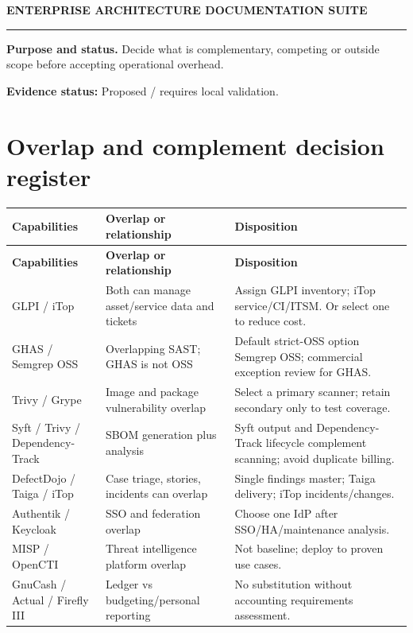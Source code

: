 \documentclass[10pt,letterpaper]{article}
\begin{document}
\begin{center}
{\large\bfseries\color{teal} ENTERPRISE ARCHITECTURE DOCUMENTATION SUITE}\par
{}\par
{}\par
\end{center}
\vspace{8pt}\hrule\vspace{12pt}
\textbf{Purpose and status.} Decide what is complementary, competing or outside scope before accepting operational overhead.\par
\textbf{Evidence status:} Proposed / requires local validation.\par
\section{Overlap and complement decision register}
\small\begin{longtable}{>{\raggedright\arraybackslash}p{}>{\raggedright\arraybackslash}p{}>{\raggedright\arraybackslash}p{}}
\toprule
\textbf{Capabilities} & \textbf{Overlap or relationship} & \textbf{Disposition}\\
\midrule\endfirsthead
\toprule
\textbf{Capabilities} & \textbf{Overlap or relationship} & \textbf{Disposition}\\
\midrule\endhead
GLPI / iTop & Both can manage asset/service data and tickets & Assign GLPI inventory; iTop service/CI/ITSM. Or select one to reduce cost.\\
GHAS / Semgrep OSS & Overlapping SAST; GHAS is not OSS & Default strict-OSS option Semgrep OSS; commercial exception review for GHAS.\\
Trivy / Grype & Image and package vulnerability overlap & Select a primary scanner; retain secondary only to test coverage.\\
Syft / Trivy / Dependency-Track & SBOM generation plus analysis & Syft output and Dependency-Track lifecycle complement scanning; avoid duplicate billing.\\
DefectDojo / Taiga / iTop & Case triage, stories, incidents can overlap & Single findings master; Taiga delivery; iTop incidents/changes.\\
Authentik / Keycloak & SSO and federation overlap & Choose one IdP after SSO/HA/maintenance analysis.\\
MISP / OpenCTI & Threat intelligence platform overlap & Not baseline; deploy to proven use cases.\\
GnuCash / Actual / Firefly III & Ledger vs budgeting/personal reporting & No substitution without accounting requirements assessment.\\
\bottomrule
\end{longtable}
\normalsize
\end{document}
